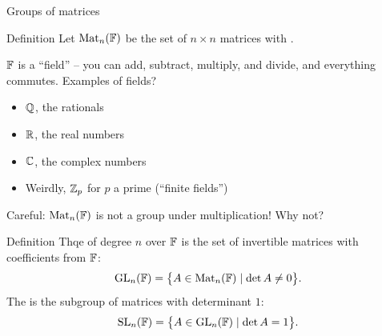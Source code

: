 \documentclass[8pt, handout]{beamer}
\newcommand{\Pause}{}      %
\begin{document}
\begin{frame}{Groups of matrices} %
  
  \Pause
  
  \begin{block}{Definition}
    Let $\operatorname{Mat}_n(\mathbb{F})$ be the set of $n\times n$ matrices with
    .
  \end{block}

  \smallskip \pause

  $\mathbb{F}$ is a ``field'' -- you can add, subtract, multiply, and divide, and everything commutes. \pause Examples of fields? \pause
  \begin{itemize}
    \item $\mathbb{Q}$, the rationals
    \item $\mathbb{R}$, the real numbers
    \item $\mathbb{C}$, the complex numbers
    \item Weirdly, $\mathbb{Z}_p$ for $p$ a prime (``finite fields'')
  \end{itemize} \pause

  \begin{alertblock}{Careful:}
    $\operatorname{Mat}_n(\mathbb{F})$ is not a group under multiplication! \pause Why not?
  \end{alertblock}
  
  \begin{block}{Definition}
    Thqe  of degree $n$ over $\mathbb{F}$ is the
    set of invertible matrices with coefficients from $\mathbb{F}$:
    \[
    \operatorname{GL}_n(\mathbb{F})=\big\{A\in\operatorname{Mat}_n(\mathbb{F})\mid \det A\neq 0\big\}. 
    \]
    \Pause The  is the subgroup of matrices with
    determinant $1$:
    \[
    \operatorname{SL}_n(\mathbb{F})=\big\{A\in\operatorname{GL}_n(\mathbb{F})\mid\det A=1\big\}.
    \]
  \end{block}

\end{frame}

\end{document}
